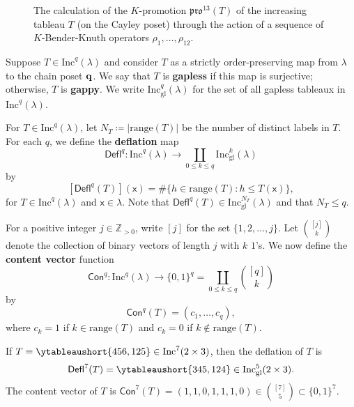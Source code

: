 \documentclass[12pt]{amsart}
\newcommand{\x}{\ensuremath{\mathsf{x}}}
\theoremstyle{definition}
\newenvironment{example}
  {\pushQED{\qed}\renewcommand{\qedsymbol}{$\diamondsuit$}\examplex}
  {\popQED\endexamplex}
\theoremstyle{remark}
\numberwithin{equation}{section}
\newcommand{\inc}{\ensuremath{\mathrm{Inc}}}
\newcommand{\incgl}{\inc_{\mathrm{gl}}}
\newcommand{\pro}{\mathfrak{pro}}
\newcommand{\deflate}{\ensuremath{\mathsf{Defl}}}
\newcommand{\content}{\ensuremath{\mathsf{Con}}}
\begin{document}
\begin{figure}[h]
\caption{The calculation of the $K$-promotion $\pro^{13}(T)$ of the increasing tableau $T$ (on the Cayley poset) through the action of a sequence of $K$-Bender-Knuth operators $\rho_1, \dots, \rho_{12}$.}\label{fig:promotion}
\end{figure}

Suppose $T \in \inc^q(\lambda)$ and consider $T$ as a strictly order-preserving map from $\lambda$ to the chain poset ${\bf q}$. We say that $T$ is {\bf gapless} if this map is surjective; otherwise, $T$ is {\bf gappy}. We write $\incgl^q(\lambda)$ for the set of all gapless tableaux in $\inc^q(\lambda)$.

For $T \in \inc^q(\lambda)$, let $N_T \coloneqq |\mathrm{range}(T)|$ be the number of distinct labels in $T$. For each $q$, we define the {\bf deflation} map \[\deflate^q : \inc^q(\lambda) \to \coprod_{0 \leq k \leq q} \incgl^k(\lambda)\] by
\[
[\deflate^q(T)](\x) =
\# \{ h \in \mathrm{range}(T): h \leq T(\x) \} ,
\]
for $T \in \inc^q(\lambda)$ and $\x \in \lambda$. Note that $\deflate^q(T) \in \incgl^{N_T}(\lambda)$ and that $N_T \leq q$.

For a positive integer $j \in \mathbb{Z}_{>0}$, write $[j]$ for the set $\{ 1, 2, \dots, j\}$. Let $\binom{[j]}{k}$ denote the collection of binary vectors of length $j$ with $k$ $1$'s. We now define the {\bf content vector} function 
\[
 \content^q : \inc^q(\lambda) \to \{ 0, 1\}^q = \coprod_{0 \leq  k \leq q} \binom{[q]}{k}
 \] 
 by 
\[
\content^q(T) = (c_1, \dots, c_q),
\] 
where $c_k = 1$ if $k \in \mathrm{range}(T)$ and $c_k = 0$ if $k \notin \mathrm{range}(T)$.

\begin{example}\label{ex:deflate}
If $T = \ytableaushort{456,125} \in \inc^7(2 \times 3)$, then the deflation of $T$ is \[\deflate^7(T) = \ytableaushort{345,124} \in \incgl^5(2 \times 3).\] The content vector of $T$ is $\content^7(T) = (1,1,0,1,1,1,0) \in \binom{[7]}{5} \subset \{0,1\}^7$.
\end{example}
\end{document}
